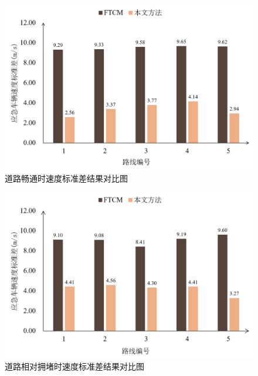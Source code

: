 
\begin{figure}[H]
	\centering
	\includegraphics[width=\linewidth]{figures/std_smooth.png}
	\caption{道路畅通时速度标准差结果对比图}
	\label{fig:std_smooth}
\end{figure}

\begin{figure}[H]
	\centering
	\includegraphics[width=\linewidth]{figures/std_relatively.png}
	\caption{道路相对拥堵时速度标准差结果对比图}
	\label{fig:std_relatively}
\end{figure}

